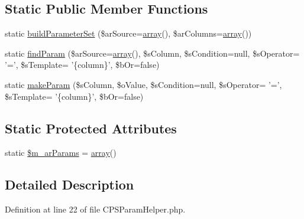 \subsection*{Static Public Member Functions}
\begin{DoxyCompactItemize}
\item 
static \hyperlink{classCPSParamHelper_a79bb28c511184548bcefbd367d4fadf9}{buildParameterSet} (\$arSource=\hyperlink{list_8php_aa3205d038c7f8feb5c9f01ac4dfadc88}{array}(), \$arColumns=\hyperlink{list_8php_aa3205d038c7f8feb5c9f01ac4dfadc88}{array}())
\item 
static \hyperlink{classCPSParamHelper_a63c76688969153ba5b4d4fb858d6c679}{findParam} (\$arSource=\hyperlink{list_8php_aa3205d038c7f8feb5c9f01ac4dfadc88}{array}(), \$sColumn, \$sCondition=null, \$sOperator= '=', \$sTemplate= '\{column\}', \$bOr=false)
\item 
static \hyperlink{classCPSParamHelper_a07939baf7e00c9559ecb32ea1f1f07d3}{makeParam} (\$sColumn, \$oValue, \$sCondition=null, \$sOperator= '=', \$sTemplate= '\{column\}', \$bOr=false)
\end{DoxyCompactItemize}
\subsection*{Static Protected Attributes}
\begin{DoxyCompactItemize}
\item 
static \hyperlink{classCPSParamHelper_a81adfd9f391cd4b9ff0f9fedd745e9d1}{\$m\_\-arParams} = \hyperlink{list_8php_aa3205d038c7f8feb5c9f01ac4dfadc88}{array}()
\end{DoxyCompactItemize}


\subsection{Detailed Description}


Definition at line 22 of file CPSParamHelper.php.



